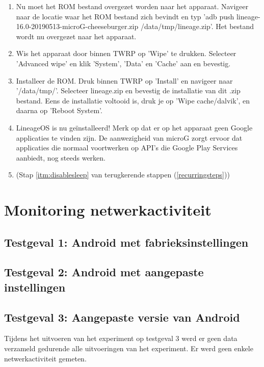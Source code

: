 \begin{enumerate}
    \item Nu moet het ROM bestand overgezet worden naar het apparaat. Navigeer naar de locatie waar het ROM bestand zich bevindt en typ 'adb push lineage-16.0-20190513-microG-cheeseburger.zip /data/tmp/lineage.zip'. Het bestand wordt nu overgezet naar het apparaat.
    
    \item Wis het apparaat door binnen TWRP op 'Wipe' te drukken. Selecteer 'Advanced wipe' en klik 'System', 'Data' en 'Cache' aan en bevestig.
    
    \item Installeer de ROM. Druk binnen TWRP op 'Install' en navigeer naar '/data/tmp/'. Selecteer lineage.zip en bevestig de installatie van dit .zip bestand. Eens de installatie voltooid is, druk je op 'Wipe cache/dalvik', en daarna op 'Reboot System'.
    
    \item 
    LineageOS is nu geïnstalleerd! Merk op dat er op het apparaat geen Google applicaties te vinden zijn. De aanwezigheid van microG zorgt ervoor dat applicaties die normaal voortwerken op API's die Google Play Services aanbiedt, nog steeds werken.
    
    \item 
     (Stap \ref{itm:disablesleep} van terugkerende stappen (\ref{recurringsteps}))
\end{enumerate}

\section{Monitoring netwerkactiviteit}

\subsection{Testgeval 1: Android met fabrieksinstellingen}

\subsection{Testgeval 2: Android met aangepaste instellingen}

\subsection{Testgeval 3: Aangepaste versie van Android}
Tijdens het uitvoeren van het experiment op testgeval 3 werd er geen data verzameld gedurende alle uitvoeringen van het experiment. Er werd geen enkele netwerkactiviteit gemeten.